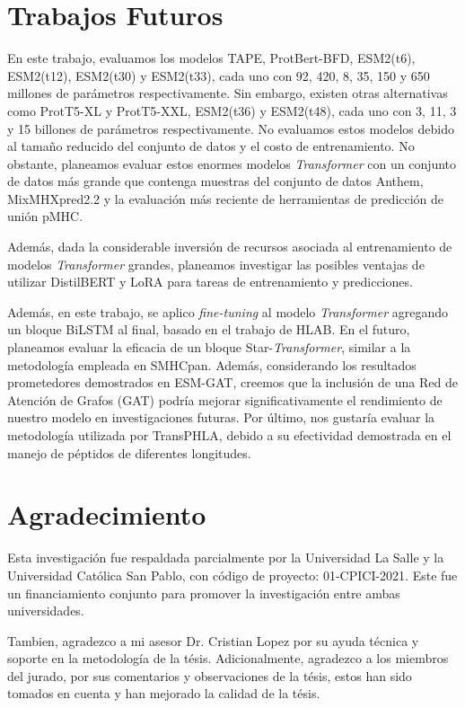\section{Trabajos Futuros}
En este trabajo, evaluamos los modelos TAPE, ProtBert-BFD, ESM2(t6), ESM2(t12), ESM2(t30) y ESM2(t33), cada uno con 92, 420, 8, 35, 150 y 650 millones de parámetros respectivamente. Sin embargo, existen otras alternativas como ProtT5-XL y ProtT5-XXL, ESM2(t36) y ESM2(t48), cada uno con 3, 11, 3 y 15 billones de parámetros respectivamente. No evaluamos estos modelos debido al tamaño reducido del conjunto de datos y el costo de entrenamiento. No obstante, planeamos evaluar estos enormes modelos \textit{Transformer} con un conjunto de datos más grande que contenga muestras del conjunto de datos Anthem, MixMHXpred2.2 y la evaluación más reciente de herramientas de predicción de unión pMHC.

Además, dada la considerable inversión de recursos asociada al entrenamiento de modelos \textit{Transformer} grandes, planeamos investigar las posibles ventajas de utilizar DistilBERT y LoRA para tareas de entrenamiento y predicciones.

Además, en este trabajo, se aplico \textit{fine-tuning} al modelo \textit{Transformer} agregando un bloque BiLSTM al final, basado en el trabajo de HLAB. En el futuro, planeamos evaluar la eficacia de un bloque Star-\textit{Transformer}, similar a la metodología empleada en SMHCpan. Además, considerando los resultados prometedores demostrados en ESM-GAT, creemos que la inclusión de una Red de Atención de Grafos (GAT) podría mejorar significativamente el rendimiento de nuestro modelo en investigaciones futuras. Por último, nos gustaría evaluar la metodología utilizada por TransPHLA, debido a su efectividad demostrada en el manejo de péptidos de diferentes longitudes.


\section{Agradecimiento}

Esta investigación fue respaldada parcialmente por la Universidad La Salle y la Universidad Católica San Pablo, con código de proyecto: 01-CPICI-2021. Este fue un financiamiento conjunto para promover la investigación entre ambas universidades. 

Tambien, agradezco a mi asesor Dr. Cristian Lopez por su ayuda técnica y soporte en la metodología de la tésis. Adicionalmente, agradezco a los miembros del jurado, por sus comentarios y observaciones de la tésis, estos han sido tomados en cuenta y han mejorado la calidad de la tésis.








